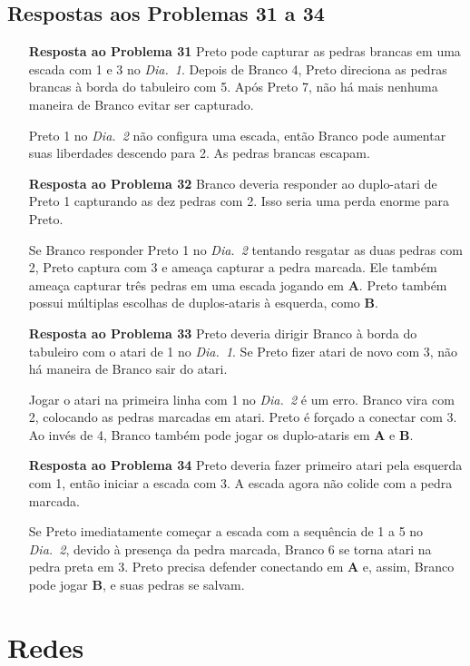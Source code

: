 \subsection{Respostas aos Problemas 31 a 34}

\begin{itemize}
    \item[\textbf{Resposta ao Problema 31}] Preto pode capturar as pedras brancas em uma escada com 1 e 3 no \emph{Dia.\@~1}. Depois de Branco 4, Preto direciona as pedras brancas à borda do tabuleiro com 5. Após Preto 7, não há mais nenhuma maneira de Branco evitar ser capturado.
    
        Preto 1 no \emph{Dia.\@~2} não configura uma escada, então Branco pode aumentar suas liberdades descendo para 2. As pedras brancas escapam.
    \item[\textbf{Resposta ao Problema 32}] Branco deveria responder ao duplo-atari de Preto 1 capturando as dez pedras com 2. Isso seria uma perda enorme para Preto.
     
        Se Branco responder Preto 1 no \emph{Dia.\@~2} tentando resgatar as duas pedras com 2, Preto captura com 3 e ameaça capturar a pedra marcada. Ele também ameaça capturar três pedras em uma escada jogando em \textbf{A}. Preto também possui múltiplas escolhas de duplos-ataris à esquerda, como \textbf{B}.
    \item[\textbf{Resposta ao Problema 33}] Preto deveria dirigir Branco à borda do tabuleiro com o atari de 1 no \emph{Dia.\@~1}. Se Preto fizer atari de novo com 3, não há maneira de Branco sair do atari.

        Jogar o atari na primeira linha com 1 no \emph{Dia.\@~2} é um erro. Branco vira com 2, colocando as pedras marcadas em atari. Preto é forçado a conectar com 3. Ao invés de 4, Branco também pode jogar os duplo-ataris em \textbf{A} e \textbf{B}.
    \item[\textbf{Resposta ao Problema 34}] Preto deveria fazer primeiro atari pela esquerda com 1, então iniciar a escada com 3. A escada agora não colide com a pedra marcada.
        
        Se Preto imediatamente começar a escada com a sequência de 1 a 5 no \emph{Dia.\@~2}, devido à presença da pedra marcada, Branco 6 se torna atari na pedra preta em 3. Preto precisa defender conectando em \textbf{A} e, assim, Branco pode jogar \textbf{B}, e suas pedras se salvam.
\end{itemize}

\section{Redes}

